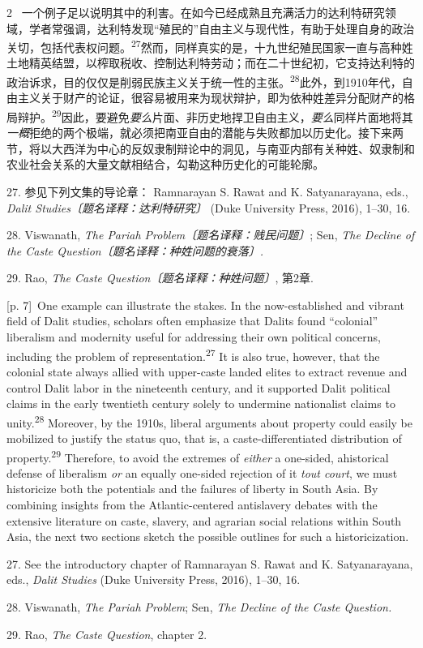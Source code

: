 \documentclass[10pt,a4paper]{article}
\begin{document}
\begin{paracol}{2}
\switchcolumn*
{\scriptsize\color{gray} [p. 7]}\ 一个例子足以说明其中的利害。在如今已经成熟且充满活力的达利特研究领域，学者常强调，达利特发现“殖民的”自由主义与现代性，有助于处理自身的政治关切，包括代表权问\mbox{题。\textsuperscript{27}}然而，同样真实的是，十九世纪殖民国家一直与高种姓土地精英结盟，以榨取税收、控制达利特劳动；而在二十世纪初，它支持达利特的政治诉求，目的仅仅是削弱民族主义关于统一性的主\mbox{张。\textsuperscript{28}}此外，到1910年代，自由主义关于财产的论证，很容易被用来为现状辩护，即为依种姓差异分配财产的格局辩\mbox{护。\textsuperscript{29}}因此，要避免\textit{要么}片面、非历史地捍卫自由主义，\textit{要么}同样片面地将其\textit{一概}拒绝的两个极端，就必须把南亚自由的潜能与失败都加以历史化。接下来两节，将以大西洋为中心的反奴隶制辩论中的洞见，与南亚内部有关种姓、奴隶制和农业社会关系的大量文献相结合，勾勒这种历史化的可能轮廓。\par{\small 27. 参见下列文集的导论章： Ramnarayan S. Rawat and K. Satyanarayana, eds., \textit{Dalit Studies〔题名译释：达利特研究〕} (Duke University Press, 2016), 1–30, 16.\par}{\small 28. Viswanath, \textit{The Pariah Problem〔题名译释：贱民问题〕}; Sen, \textit{The Decline of the Caste Question〔题名译释：种姓问题的衰落〕.}\par}{\small 29. Rao, \textit{The Caste Question〔题名译释：种姓问题〕}, 第2章.\par}
\switchcolumn
{\scriptsize\color{gray} [p. 7]}\ One example can illustrate the stakes. In the now-established and vibrant field of Dalit studies, scholars often emphasize that Dalits found “colonial” liberalism and modernity useful for addressing their own political concerns, including the problem of representation.\nobreak\textsuperscript{27} It is also true, however, that the colonial state always allied with upper-caste landed elites to extract revenue and control Dalit labor in the nineteenth century, and it supported Dalit political claims in the early twentieth century solely to undermine nationalist claims to unity.\nobreak\textsuperscript{28} Moreover, by the 1910s, liberal arguments about property could easily be mobilized to justify the status quo, that is, a caste-differentiated distribution of property.\nobreak\textsuperscript{29} Therefore, to avoid the extremes of \textit{either} a one-sided, ahistorical defense of liberalism \textit{or} an equally one-sided rejection of it \textit{tout court}, we must historicize both the potentials and the failures of liberty in South Asia. By combining insights from the Atlantic-centered antislavery debates with the extensive literature on caste, slavery, and agrarian social relations within South Asia, the next two sections sketch the possible outlines for such a historicization.\par{\small 27. See the introductory chapter of Ramnarayan S. Rawat and K. Satyanarayana, eds., \textit{Dalit Studies} (Duke University Press, 2016), 1–30, 16.\par}{\small 28. Viswanath, \textit{The Pariah Problem}; Sen, \textit{The Decline of the Caste Question.}\par}{\small 29. Rao, \textit{The Caste Question}, chapter 2.\par}
\switchcolumn*
\end{paracol}
\end{document}
